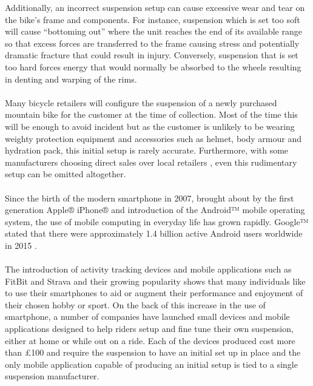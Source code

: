 	Additionally, an incorrect suspension setup can cause excessive wear and tear on the	bike’s frame and components. For instance, suspension which is set too soft will cause “bottoming out” where the unit reaches the end of its available range so that excess forces are transferred to the frame causing stress and potentially dramatic fracture that could result in injury. Conversely, suspension that is set too hard forces energy that would normally be absorbed to the wheels resulting in denting and warping of the rims.
	\\\\
	Many bicycle retailers will configure the suspension of a newly purchased mountain bike for the customer at the time of collection. Most of the time this will be enough to avoid incident but as the customer is unlikely to be wearing weighty protection equipment and accessories such as helmet, body armour and hydration pack, this initial setup is rarely accurate. Furthermore, with some manufacturers choosing direct sales over
	local retailers \citep{roseonline,ytonline}, even this rudimentary setup can be omitted altogether.
	\\\\
	Since the birth of the modern smartphone in 2007, brought about by the first generation Apple® iPhone® and introduction of the Android™ mobile operating system, the use of mobile computing in everyday life has grown rapidly. Google™ stated that there were approximately 1.4 billion active Android users worldwide in 2015 \citep{androidusers}.
	\\\\
	The introduction of activity tracking devices and mobile applications such as FitBit \citep{fitbit} and Strava \citep{strava} and their growing popularity \citep{apppopularity} shows that many individuals like to  use  their smartphones to aid or augment their performance and enjoyment of their chosen  hobby or sport. On the back of this increase in the use of smartphone, a number of companies have launched small devices \citep{sussmybike, shockwiztrademark} and mobile applications \citep{foxird} designed to help riders setup and fine tune their own suspension, either at home or while out on a ride. Each of the devices produced cost more than £100 and require the suspension to have an initial set up in place and the only mobile application capable of producing an initial setup is tied to a single suspension manufacturer.
